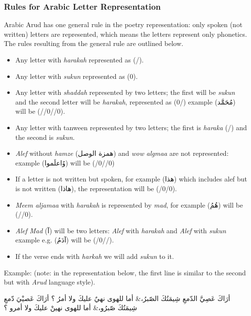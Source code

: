 \subsubsection{Rules for Arabic Letter Representation}
Arabic Arud has one general rule in the poetry representation: only spoken (not written) letters  are represented, which means the letters represent only phonetics. The rules resulting from the general rule are outlined below.

\begin{itemize}
  \item Any letter with \textit{harakah} represented as (/).
  \item Any letter with \textit{sukun} represented as (0).
  \item Any letter with \textit{shaddah} represented by two letters; the first will be \textit{sukun} and the second letter will be \textit{harakah}, represented as (0/) example (\textarabic{مُحَمََّد}) will be (//0//0).
  \item Any letter with tanween represented by two letters; the first is \textit{haraka} (/) and the second is \textit{sukun}.
  \item \textit{Alef} without \textit{hamze} (\textarabic{همزة الوصل}) and \textit{wow algmaa} are not represented: example (\textarabic{وُاعلَموا}) will be (/0//0)
  \item If a letter is not written but spoken, for example (\textarabic{هذا}) which includes alef but is not written (\textarabic{هاذا}), the representation will be (/0/0).
  \item \textit{Meem aljamaa} with \textit{harakah} is represented by \textit{mad}, for example (\textarabic{هُمُ}) will be (//0).
  \item \textit{Alef Mad} (\textarabic{آ}) will be two letters: \textit{Alef} with \textit{harakah} and \textit{Alef} with \textit{sukun} example e.g. (\textarabic{آدَمُ}) will be (/0//).
  \item If the verse ends with \textit{harkah} we will add \textit{sukun} to it.
\end{itemize}
Example: (note: in the representation below, the first line is similar to the second but with \textit{Arud} language style).
\begin{Arabic}
  \begin{traditionalpoem*}
    أرَاكَ عَصِيَّ الدّمعِ شِيمَتُكَ الصّبرُ،\quad & \quad أما للهوى نهيٌ عليكَ ولا أمرُ ؟
    أرَاكَ عَصيْيَ دّمعِ شِيمَتُكَ صّبرُو،\quad & \quad أما للهوى نهينْ عليكَ ولا أمرو ؟
  \end{traditionalpoem*}
\end{Arabic}


